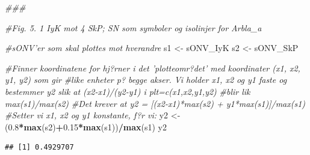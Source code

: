 \documentclass[]{article}
\newenvironment{Shaded}{\begin{snugshade}}{\end{snugshade}}
\newcommand{\CommentTok}[1]{\textcolor[rgb]{0.56,0.35,0.01}{\textit{#1}}}
\newcommand{\FloatTok}[1]{\textcolor[rgb]{0.00,0.00,0.81}{#1}}
\newcommand{\KeywordTok}[1]{\textcolor[rgb]{0.13,0.29,0.53}{\textbf{#1}}}
\newcommand{\NormalTok}[1]{#1}
\newcommand{\OperatorTok}[1]{\textcolor[rgb]{0.81,0.36,0.00}{\textbf{#1}}}
\newcommand{\StringTok}[1]{\textcolor[rgb]{0.31,0.60,0.02}{#1}}
\begin{document}
\begin{Shaded}
\begin{Highlighting}[]
\CommentTok{###}

\CommentTok{#Fig. 5. 1 IyK mot 4 SkP; SN som symboler og isolinjer for Arbla_a}

\CommentTok{#sONV'er som skal plottes mot hverandre}
\NormalTok{s1 <-}\StringTok{ }\NormalTok{sONV_IyK}
\NormalTok{s2 <-}\StringTok{ }\NormalTok{sONV_SkP}

\CommentTok{#Finner koordinatene for hj?rner i det 'plotteomr?det' med koordinater (x1, x2, y1, y2) som gir}
\CommentTok{#like enheter p? begge akser. Vi holder x1, x2 og y1 faste og bestemmer y2 slik at (x2-x1)/(y2-y1) i plt=c(x1,x2,y1,y2)}
\CommentTok{#blir lik max(s1)/max(s2)}
\CommentTok{#Det krever at y2 = [(x2-x1)*max(s2) + y1*max(s1)]/max(s1) }
\CommentTok{#Setter vi x1, x2 og y1 konstante, f?r vi:}
\NormalTok{y2 <-}\StringTok{ }\NormalTok{(}\FloatTok{0.8}\OperatorTok{*}\KeywordTok{max}\NormalTok{(s2)}\OperatorTok{+}\FloatTok{0.15}\OperatorTok{*}\KeywordTok{max}\NormalTok{(s1))}\OperatorTok{/}\KeywordTok{max}\NormalTok{(s1)}
\NormalTok{y2}
\end{Highlighting}
\end{Shaded}

\begin{verbatim}
## [1] 0.4929707
\end{verbatim}
\end{document}
